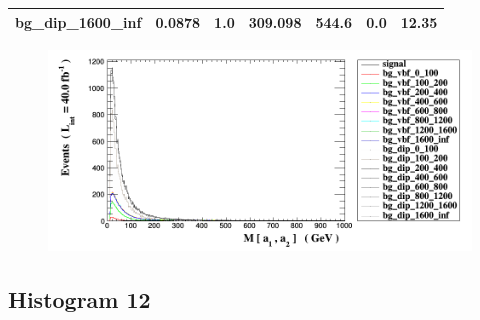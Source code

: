 \documentclass[a4paper, 10pt]{article}
\begin{document}
\begin{table}[H]
\begin{center}
\begin{tabular}{|m{23.0mm}|m{23.0mm}|m{18.0mm}|m{19.0mm}|m{19.0mm}|m{19.0mm}|m{19.0mm}|}
      \hline
      {\cellcolor{white}         bg\_dip\_1600\_inf}& {\cellcolor{white}         0.0878}& {\cellcolor{white}         1.0}& {\cellcolor{white}         309.098}& {\cellcolor{white}         544.6}& {\cellcolor{orange}         0.0}& {\cellcolor{orange}         12.35}\\
\hline
    \end{tabular}
  \end{center}
\end{table}

\begin{figure}[H]
  \begin{center}
    \includegraphics[scale=0.45]{selection_10.png}\\
\caption{   }
  \end{center}
\end{figure}
      \newpage
\subsection{ Histogram 12}
\end{document}
